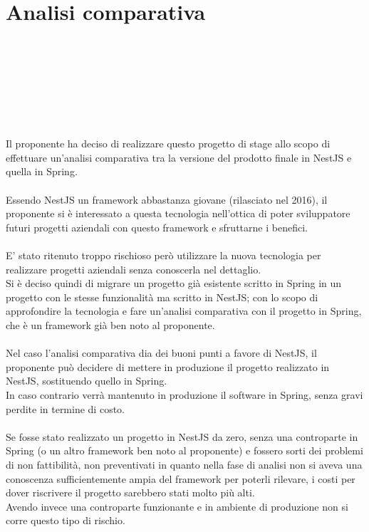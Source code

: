 
\chapter{Analisi comparativa}
\label{cap:analisi-comparativa}

\\\\\\\\\\\\\\
Il proponente ha deciso di realizzare questo progetto di stage allo scopo di effettuare 
un'analisi comparativa tra la versione del prodotto finale in NestJS e quella in Spring.
\\\\
Essendo NestJS un framework abbastanza giovane (rilasciato nel 2016), il proponente si 
è interessato a questa tecnologia nell'ottica di poter sviluppatore futuri progetti 
aziendali con questo framework e sfruttarne i benefici.
\\\\
E' stato ritenuto troppo rischioso però utilizzare la nuova tecnologia per realizzare
progetti aziendali senza conoscerla nel dettaglio. 
\\
Si è deciso quindi di migrare un progetto già 
esistente scritto in Spring in un progetto con le stesse funzionalità ma scritto in NestJS; con 
lo scopo di approfondire la tecnologia e fare un'analisi comparativa
con il progetto in Spring, che è un framework già ben noto al proponente.
\\\\
Nel caso l'analisi comparativa dia dei buoni punti a favore di NestJS, il proponente può 
decidere di mettere in produzione il progetto realizzato in NestJS, sostituendo quello
in Spring.
\\
In caso contrario verrà mantenuto in produzione il software in Spring, senza gravi perdite in termine 
di costo.
\\\\
Se fosse stato realizzato un progetto in NestJS da zero, senza una controparte in Spring (o un altro framework ben noto al proponente)
e fossero sorti dei problemi di non fattibilità, non preventivati in quanto nella fase di analisi 
non si aveva una conoscenza sufficientemente ampia del framework per poterli rilevare, i
costi per dover riscrivere il progetto sarebbero stati molto più alti.
\\
Avendo invece una controparte funzionante e in ambiente di produzione non si corre questo tipo di rischio.

